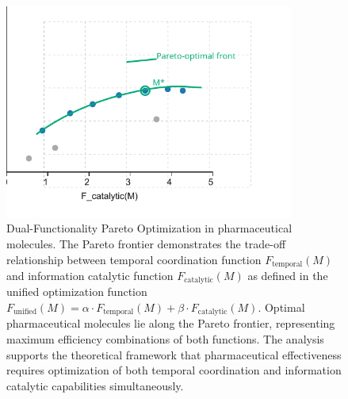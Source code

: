 \begin{figure}[htbp]
\centering
\includegraphics[width=0.85\textwidth]{images/dual-functionality-pareto.pdf}
\caption{Dual-Functionality Pareto Optimization in pharmaceutical molecules. The Pareto frontier demonstrates the trade-off relationship between temporal coordination function $F_{\text{temporal}}(M)$ and information catalytic function $F_{\text{catalytic}}(M)$ as defined in the unified optimization function $F_{\text{unified}}(M) = \alpha \cdot F_{\text{temporal}}(M) + \beta \cdot F_{\text{catalytic}}(M)$. Optimal pharmaceutical molecules lie along the Pareto frontier, representing maximum efficiency combinations of both functions. The analysis supports the theoretical framework that pharmaceutical effectiveness requires optimization of both temporal coordination and information catalytic capabilities simultaneously.}
\label{fig:dual_functionality_pareto}
\end{figure}

